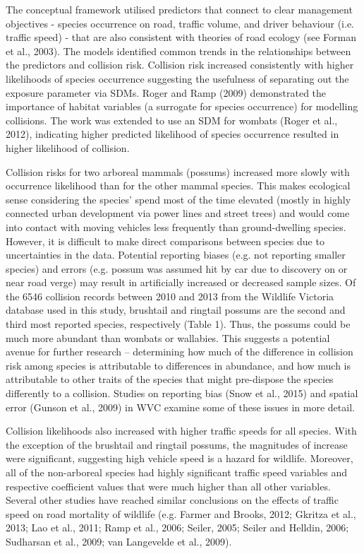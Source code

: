 The conceptual framework utilised predictors that connect to clear management objectives - species occurrence on road, traffic volume, and driver behaviour (i.e. traffic speed) - that are also consistent with theories of road ecology (see Forman et al., 2003). The models identified common trends in the relationships between the predictors and collision risk. Collision risk increased consistently with higher likelihoods of species occurrence suggesting the usefulness of separating out the exposure parameter via SDMs.  Roger and Ramp (2009) demonstrated the importance of habitat variables (a surrogate for species occurrence) for modelling collisions. The work was extended to use an SDM for wombats (Roger et al., 2012), indicating higher predicted likelihood of species occurrence resulted in higher likelihood of collision.

Collision risks for two arboreal mammals (possums) increased more slowly with occurrence likelihood than for the other mammal species.  This makes ecological sense considering the species’ spend most of the time elevated (mostly in highly connected urban development via power lines and street trees) and would come into contact with moving vehicles less frequently than ground-dwelling species.  However, it is difficult to make direct comparisons between species due to uncertainties in the data.  Potential reporting biases (e.g. not reporting smaller species) and errors (e.g. possum was assumed hit by car due to discovery on or near road verge) may result in artificially increased or decreased sample sizes. Of the 6546 collision records between 2010 and 2013 from the Wildlife Victoria database used in this study, brushtail and ringtail possums are the second and third most reported species, respectively (Table 1).  Thus, the possums could be much more abundant than wombats or wallabies. This suggests a potential avenue for further research – determining how much of the difference in collision risk among species is attributable to differences in abundance, and how much is attributable to other traits of the species that might pre-dispose the species differently to a collision. Studies on reporting bias (Snow et al., 2015) and spatial error (Gunson et al., 2009) in WVC examine some of these issues in more detail.

Collision likelihoods also increased with higher traffic speeds for all species.  With the exception of the brushtail and ringtail possums, the magnitudes of increase were significant, suggesting high vehicle speed is a hazard for wildlife.  Moreover, all of the non-arboreal species had highly significant traffic speed variables and respective coefficient values that were much higher than all other variables. Several other studies have reached similar conclusions on the effects of traffic speed on road mortality of wildlife (e.g. Farmer and Brooks, 2012; Gkritza et al., 2013; Lao et al., 2011; Ramp et al., 2006; Seiler, 2005; Seiler and Helldin, 2006; Sudharsan et al., 2009; van Langevelde et al., 2009).

